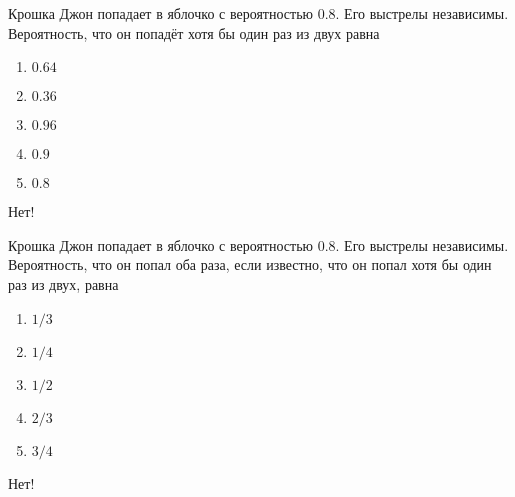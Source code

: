 \documentclass[t]{beamer}
\begin{document}
 \begin{frame} \label{1-No} 
\begin{block}{1} 

Крошка Джон  попадает в яблочко с вероятностью $0.8$. Его выстрелы независимы. Вероятность, что он попадёт хотя бы один раз из двух равна
 


 \end{block} 
\begin{enumerate} 
\item[] \hyperlink{1-No}{\beamergotobutton{} $0.64$}
\item[] \hyperlink{1-No}{\beamergotobutton{} $0.36$}
\item[] \hyperlink{1-Yes}{\beamergotobutton{} $0.96$}
\item[] \hyperlink{1-No}{\beamergotobutton{} $0.9$
}
\item[] \hyperlink{1-No}{\beamergotobutton{} $0.8$}
\end{enumerate} 

 \alert{Нет!} 
\end{frame} 


 \begin{frame} \label{2-No} 
\begin{block}{2} 

Крошка Джон попадает в яблочко с вероятностью $0.8$. Его выстрелы независимы. Вероятность, что он попал оба раза, если известно, что он попал хотя бы один раз из двух, равна
    


 \end{block} 
\begin{enumerate} 
\item[] \hyperlink{2-No}{\beamergotobutton{} $1/3$}
\item[] \hyperlink{2-No}{\beamergotobutton{} $1/4$
}
\item[] \hyperlink{2-No}{\beamergotobutton{} $1/2$}
\item[] \hyperlink{2-Yes}{\beamergotobutton{} $2/3$}
\item[] \hyperlink{2-No}{\beamergotobutton{} $3/4$}
\end{enumerate} 

 \alert{Нет!} 
\end{frame} 
\end{document}
